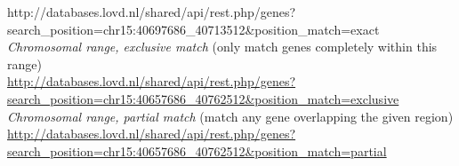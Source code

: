 \begin{description}
       {http://databases.lovd.nl/shared/api/rest.php/genes?\\
       \phantom{..........}search\_position=chr15:40697686\_40713512\&position\_match=exact}\\
  \emph{Chromosomal range, exclusive match} (only match genes completely within this range)\\
  \href{http://databases.lovd.nl/shared/api/rest.php/genes?search_position=chr15:40657686_40762512&position_match=exclusive}
       {http://databases.lovd.nl/shared/api/rest.php/genes?\\
       \phantom{..........}search\_position=chr15:40657686\_40762512\&position\_match=exclusive}\\
  \emph{Chromosomal range, partial match} (match any gene overlapping the given region)\\
  \href{http://databases.lovd.nl/shared/api/rest.php/genes?search_position=chr15:40657686_40762512&position_match=partial}
       {http://databases.lovd.nl/shared/api/rest.php/genes?\\
       \phantom{..........}search\_position=chr15:40657686\_40762512\&position\_match=partial}
\end{description}
\clearpage

